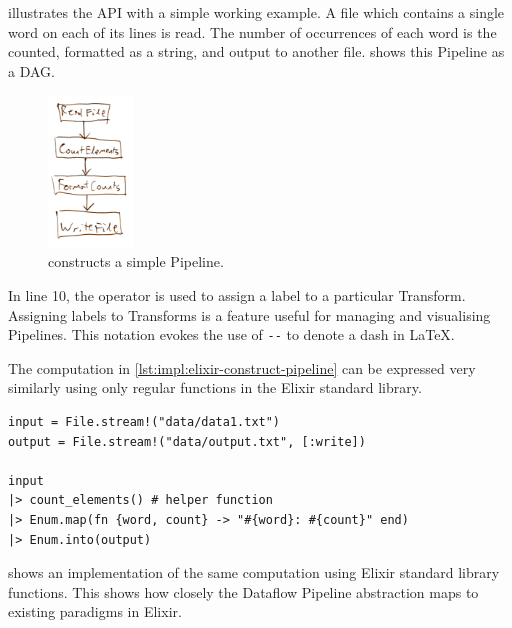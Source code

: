  illustrates the API with a simple working example.
A file which contains a single word on each of its lines is read.
The number of occurrences of each word is the counted, formatted as a string, and output to another file.
 shows this Pipeline as a DAG.

\begin{figure}[h]
	\centering
	\includegraphics[width=0.2\textwidth]{images/temp/dsl-simple-pipeline}
	\caption[A simple Pipeline constructed in \cref{lst:impl:elixir-construct-pipeline}.]{ constructs a simple Pipeline.}
	\label{fig:impl:dsl-simple-pipeline}
\end{figure}



In line 10, the \exs{--} operator is used to assign a label to a particular Transform.
Assigning labels to Transforms is a feature useful for managing and visualising Pipelines.
This notation evokes the use of \verb|--| to denote a dash in \LaTeX.

\begin{listing}[h]
	\caption[An implementation of the computation in \cref{lst:impl:elixir-construct-pipeline} using standard sequential functions.]{The computation in \cref{lst:impl:elixir-construct-pipeline} can be expressed very similarly using only regular functions in the Elixir standard library.}
	\label{lst:impl:elixir-normal-comparison}
	\begin{verbatim}
input = File.stream!("data/data1.txt")
output = File.stream!("data/output.txt", [:write])

input
|> count_elements() # helper function
|> Enum.map(fn {word, count} -> "#{word}: #{count}" end)
|> Enum.into(output)
	\end{verbatim}
\end{listing}

 shows an implementation of the same computation using Elixir standard library functions.
This shows how closely the Dataflow Pipeline abstraction maps to existing paradigms in Elixir.


